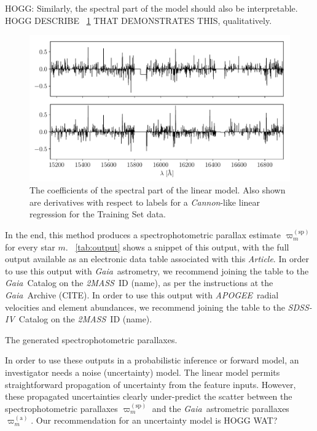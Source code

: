 \documentclass[modern]{aastex62}
\newcommand{\documentname}{\textsl{Article}}
\newcommand{\acronym}[1]{{\small{#1}}}
\newcommand{\project}[1]{\textsl{#1}}
\newcommand{\apogee}{\project{\acronym{APOGEE}}}
\newcommand{\gaia}{\project{Gaia}}
\newcommand{\zmass}{\project{\acronym{2MASS}}}
\newcommand{\sdssiv}{\project{\acronym{SDSS-IV}}}
\newcommand{\gparallax}{\varpi^{(\mathrm{a})}}
\newcommand{\sparallax}{\varpi^{(\mathrm{sp})}}
\begin{document}
HOGG: Similarly, the spectral part of the model should also be
interpretable. HOGG DESCRIBE \figurename~\ref{fig:spectral} THAT
DEMONSTRATES THIS, qualitatively.
\begin{figure}
\includegraphics[width=\textwidth]{coefficients.pdf}
\caption{The coefficients of the spectral part of the linear model.
  Also shown are derivatives with respect to labels for a \project{Cannon}-like
  linear regression for the Training Set data.\label{fig:spectral}}
\end{figure}

In the end, this method produces a spectrophotometric parallax estimate $\sparallax_m$ for
every star $m$.
\tablename~\ref{tab:output} shows a snippet of this output, with the full output available
as an electronic data table associated with this \documentname.
In order to use this output with \gaia\ astrometry, we recommend joining the table to the
\gaia\ Catalog on the \zmass\ ID (name), as per the instructions at the \gaia\ Archive (CITE).
In order to use this output with \apogee\ radial velocities and element abundances, we recommend
joining the table to the \sdssiv\ Catalog on the \zmass\ ID (name).
\begin{table}
\caption{The generated spectrophotometric parallaxes.\label{tab:output}}
\end{table}

In order to use these outputs in a probabilistic inference or forward model,
an investigator needs a noise (uncertainty) model.
The linear model permits straightforward propagation of uncertainty from the
feature inputs.
However, these propagated uncertainties clearly under-predict the scatter between
the spectrophotometric parallaxes $\sparallax_m$ and the \gaia\ astrometric
parallaxes $\gparallax_m$.
Our recommendation for an uncertainty model is HOGG WAT?
\end{document}
